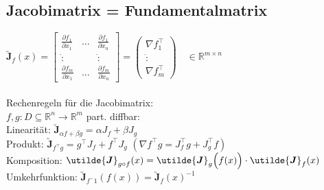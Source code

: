 \documentclass[6pt,a4paper]{scrartcl}
\let\olddot = \dot
\newcommand{\ma}[1]{\ensuremath{\utilde{\boldsymbol {#1}}}}										%
\newcommand{\svdots}{\ensuremath{\olddot :}}													%
\renewcommand*{\dot}[1]{\accentset{\mbox{\textrm{\large\bfseries .}} }{#1}}						%
\begin{document}
\begin{multicols}{4}
\subsection{Jacobimatrix = Fundamentalmatrix}
$\ma J_f (x) = \begin{bmatrix} \frac{\partial f_1}{\partial x_1} & ... & \frac{\partial f_1}{\partial x_n} \\ \svdots & & \svdots \\ \frac{\partial f_m}{\partial x_1} & ... & \frac{\partial f_m}{\partial x_n} \end{bmatrix} = \begin{pmatrix} \nabla f_1^\top \\ \svdots \\ \nabla f_m^\top \end{pmatrix}  \quad \in \mathbb R^{m \times n}$\\ \\
Rechenregeln für die Jacobimatrix:\\
$f,g: D \subseteq \mathbb R^n \rightarrow \mathbb R^m$ part. diffbar:\\
Linearität: $\ma J_{\alpha f + \beta g} = \alpha J_f + \beta J_g$\\
Produkt: $\ma J_{f^\top g} = g^\top J_f + f^\top J_g$ \quad $(\nabla f^\top g = J_f^\top g + J_g^\top f)$\\
Komposition: $\ma J_{g \circ f}(x) = \ma J_g\Bigl(f(x)\Bigr) \cdot \ma J_f(x)$\\
Umkehrfunktion: $\ma J_{f^-1} (f(x)) = \ma J_f (x)^{-1}$





\end{multicols}
\end{document}
